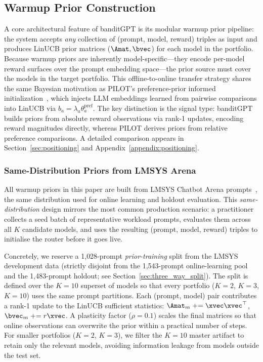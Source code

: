 \subsection{Warmup Prior Construction}
\label{sec:warmup_prior_construction}

A core architectural feature of banditGPT is its modular warmup prior pipeline: the system accepts \emph{any} collection of (prompt, model, reward) triples as input and produces LinUCB prior matrices ($\Amat, \bvec$) for each model in the portfolio.
Because warmup priors are inherently model-specific---they encode per-model reward surfaces over the prompt embedding space---the prior source must cover the models in the target portfolio.
This offline-to-online transfer strategy shares the same Bayesian motivation as PILOT's preference-prior informed initialization~\cite{panda2025pilot}, which injects LLM embeddings learned from pairwise comparisons into LinUCB via $b_a{=}\lambda_a\theta_a^{\mathrm{pref}}$.
The key distinction is the signal type: banditGPT builds priors from absolute reward observations via rank-1 updates, encoding reward magnitudes directly, whereas PILOT derives priors from relative preference comparisons.
A detailed comparison appears in Section~\ref{sec:positioning} and Appendix~\ref{appendix:positioning}.

\subsubsection{Same-Distribution Priors from LMSYS Arena}

All warmup priors in this paper are built from LMSYS Chatbot Arena prompts~\cite{zheng2023judging}, the same distribution used for online learning and holdout evaluation.
This \emph{same-distribution} design mirrors the most common production scenario: a practitioner collects a seed batch of representative workload prompts, evaluates them across all $K$ candidate models, and uses the resulting (prompt, model, reward) triples to initialise the router before it goes live.

Concretely, we reserve a 1{,}028-prompt \emph{prior-training} split from the LMSYS development data (strictly disjoint from the 1{,}543-prompt online-learning pool and the 1{,}483-prompt holdout; see Section~\ref{sec:three_way_split}).
The split is defined over the $K{=}10$ superset of models so that every portfolio ($K{=}2$, $K{=}3$, $K{=}10$) uses the same prompt partitions.
Each (prompt, model) pair contributes a rank-1 update to the LinUCB sufficient statistics: $\Amat_m \mathrel{+}= \xvec\xvec^\top$, $\bvec_m \mathrel{+}= r\xvec$.
A plasticity factor ($\rho{=}0.1$) scales the final matrices so that online observations can overwrite the prior within a practical number of steps.
For smaller portfolios ($K{=}2$, $K{=}3$), we filter the $K{=}10$ master artifact to retain only the relevant models, avoiding information leakage from models outside the test set.

